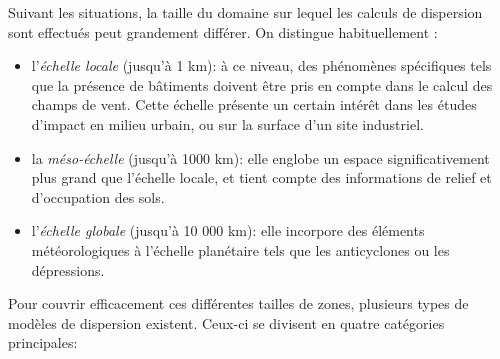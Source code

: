 	Suivant les situations, la taille du domaine sur lequel les calculs de dispersion sont effectués peut grandement différer. On distingue habituellement : \\
	\begin{itemize}
		\item l'\textit{échelle locale} (jusqu'à 1 km): à ce niveau, des phénomènes spécifiques tels que la présence de bâtiments doivent être pris en compte dans le calcul des champs de vent. Cette échelle présente un certain intérêt dans les études d'impact en milieu urbain, ou sur la surface d'un site industriel.
		\item la \textit{méso-échelle} (jusqu'à 1000 km): elle englobe un espace significativement plus grand que l'échelle locale, et tient compte des informations de relief et d'occupation des sols.
		\item l'\textit{échelle globale} (jusqu'à 10 000 km): elle incorpore des éléments météorologiques à l'échelle planétaire tels que les anticyclones ou les dépressions.\\
	\end{itemize}
	
	Pour couvrir efficacement ces différentes tailles de zones, plusieurs types de modèles de dispersion existent. Ceux-ci se divisent en quatre catégories principales:\\
	
